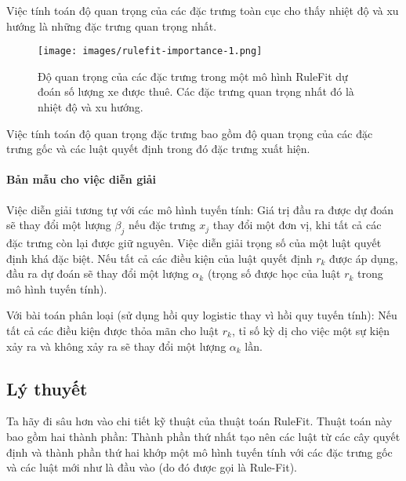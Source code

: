Việc tính toán độ quan trọng của các đặc trưng toàn cục cho thấy nhiệt độ và xu hướng là những đặc trưng quan trọng nhất.

\begin{figure*}[h!]
	\centering
	\texttt{[image: images/rulefit-importance-1.png]}
	\label{fig:4_22}
	\caption{Độ quan trọng của các đặc trưng trong một mô hình RuleFit dự đoán số lượng xe được thuê. Các đặc trưng quan trọng nhất đó là nhiệt độ và xu hướng.}
	
\end{figure*}

Việc tính toán độ quan trọng đặc trưng bao gồm độ quan trọng của các đặc trưng gốc và các luật quyết định trong đó đặc trưng xuất hiện.

\paragraph{Bản mẫu cho việc diễn giải}

Việc diễn giải tương tự với các mô hình tuyến tính: Giá trị đầu ra được dự đoán sẽ thay đổi một lượng $\beta_j$ nếu đặc trưng $x_j$ thay đổi một đơn vị, khi tất cả các đặc trưng còn lại được giữ nguyên. Việc diễn giải trọng số của một luật quyết định khá đặc biệt. Nếu tất cả các điều kiện của luật quyết định $r_k$ được áp dụng, đầu ra dự đoán sẽ thay đổi một lượng $\alpha_k$ (trọng số được học của luật $r_k$ trong mô hình tuyến tính).

Với bài toán phân loại (sử dụng hồi quy logistic thay vì hồi quy tuyến tính): Nếu tất cả các điều kiện được thỏa mãn cho luật $r_k$, tỉ số kỳ dị cho việc một sự kiện xảy ra và không xảy ra sẽ thay đổi một lượng $\alpha_k$ lần.

\subsection{Lý thuyết}

Ta hãy đi sâu hơn vào chi tiết kỹ thuật của thuật toán RuleFit. Thuật toán này bao gồm hai thành phần: Thành phần thứ nhất tạo nên các luật từ các cây quyết định và thành phần thứ hai khớp một mô hình tuyến tính với các đặc trưng gốc và các luật mới như là đầu vào (do đó được gọi là Rule-Fit).

